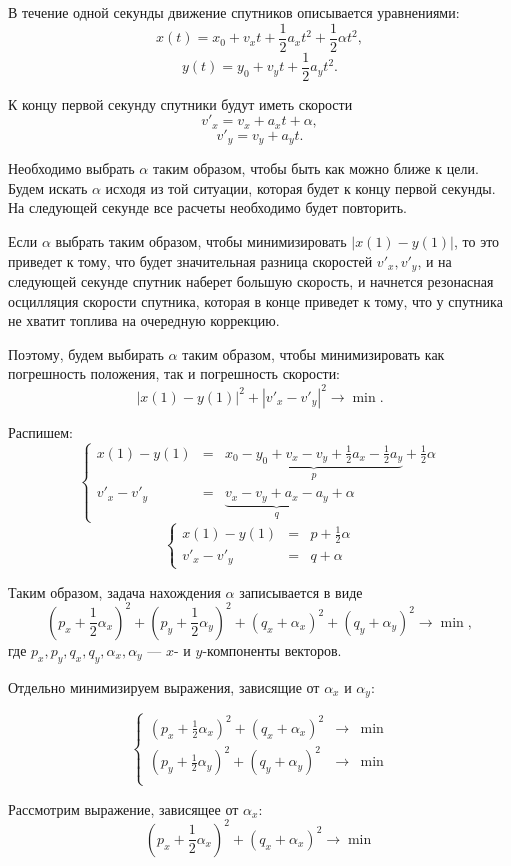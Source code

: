 \documentclass[a4paper]{article}
\begin{document}
В течение одной секунды движение спутников описывается уравнениями:
$$x(t)=x_0+v_xt+\frac12a_xt^2+\frac12\alpha t^2,$$
$$y(t)=y_0+v_yt+\frac12a_yt^2.$$

К концу первой секунду спутники будут иметь скорости
$$v'_x=v_x+a_xt+\alpha,$$
$$v'_y=v_y+a_yt.$$

Необходимо выбрать $\alpha$ таким образом, чтобы быть как можно ближе к цели. Будем искать $\alpha$ исходя из той ситуации, которая будет к концу первой секунды. На следующей секунде все расчеты необходимо будет повторить.

Если $\alpha$ выбрать таким образом, чтобы минимизировать $\left|x(1)-y(1)\right|$, то это приведет к тому, что будет значительная разница скоростей $v'_x, v'_y$, и на следующей секунде спутник наберет большую скорость, и начнется резонасная осцилляция скорости спутника, которая в конце приведет к тому, что у спутника не хватит топлива на очередную коррекцию.

Поэтому, будем выбирать $\alpha$ таким образом, чтобы минимизировать как погрешность положения, так и погрешность скорости:
$$\left|x(1)-y(1)\right|^2+\left|v'_x-v'_y\right|^2\rightarrow\min.$$

Распишем:
$$\left\{
\begin{array}{rcl}
x(1)-y(1)&=&\underbrace{x_0-y_0+v_x-v_y+\frac12a_x-\frac12a_y}_{p}+\frac12\alpha\\
v'_x-v'_y&=&\underbrace{v_x-v_y+a_x-a_y}_{q}+\alpha
\end{array}\right.
$$
$$\left\{
\begin{array}{rcl}
x(1)-y(1)&=&p+\frac12\alpha\\
v'_x-v'_y&=&q+\alpha
\end{array}\right.$$

Таким образом, задача нахождения $\alpha$ записывается в виде
$$(p_x+\frac12\alpha_x)^2+(p_y+\frac12\alpha_y)^2+(q_x+\alpha_x)^2+(q_y+\alpha_y)^2\rightarrow\min,$$
где $p_x,p_y,q_x,q_y,\alpha_x,\alpha_y$ --- $x$- и $y$-компоненты векторов.

Отдельно минимизируем выражения, зависящие от $\alpha_x$ и $\alpha_y$:

$$\left\{
\begin{array}{rcl}
(p_x+\frac12\alpha_x)^2+(q_x+\alpha_x)^2&\rightarrow&\min\\
(p_y+\frac12\alpha_y)^2+(q_y+\alpha_y)^2&\rightarrow&\min\\
\end{array}\right.$$

Рассмотрим выражение, зависящее от $\alpha_x$:
$$(p_x+\frac12\alpha_x)^2+(q_x+\alpha_x)^2\rightarrow\min$$
\end{document}
